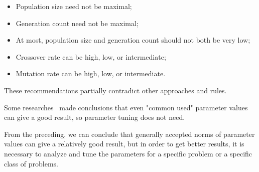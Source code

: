 \begin{itemize}
	\item Population size need not be maximal;
	\item Generation count need not be maximal;
	\item At most, population size and generation count should not both be very
	low;
	\item Crossover rate can be high, low, or intermediate;
	\item Mutation rate can be high, low, or intermediate.
\end{itemize}

These recommendations partially contradict other approaches and rules.  

Some researches~\cite{smit2009comparing, arcuri2013parameter} made conclusions that even "common used" parameter values can  give a good result, so parameter tuning does not need.

From the preceding, we can conclude that generally accepted norms of parameter values can give a relatively good result, but in order to get better results, it is necessary to analyze and tune the parameters for a specific problem or a specific class of problems.


